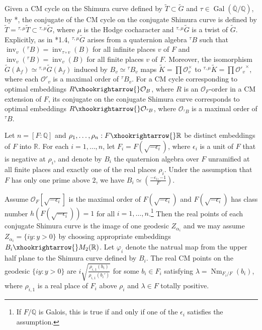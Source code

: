 \documentclass{amsart}
\numberwithin{equation}{subsection}
\numberwithin{theorem}{section}
\theoremstyle{definition}
\theoremstyle{remark}
\newcommand{\bA}{\mathbb{A}}
\newcommand{\bQ}{\mathbb{Q}}
\newcommand{\bR}{\mathbb{R}}
\newcommand{\cO}{\mathcal{O}}
\newcommand{\fp}{\mathfrak{p}}
\DeclareMathOperator{\Nm}{Nm}
\DeclareMathOperator{\Gal}{Gal}
\DeclareMathOperator{\inv}{inv}
\begin{document}
Given a CM cycle on the Shimura curve defined by $\widetilde{T}\subset \widetilde{G}$ and $\tau \in \Gal(\overline{\bQ}/\bQ)$, by \cite{MR654325}*{\MakeUppercase{}}, the conjugate of the CM cycle on the conjugate Shimura curve is defined by $\widetilde{T} = {}^{\tau,\mu}\widetilde{T}\subset{}^{\tau,\mu}\widetilde{G}$, where $\mu$ is the Hodge cocharacter and ${}^{\tau,\mu}\widetilde{G}$ is a twist of $\widetilde{G}$. Explicitly, as in \cite{MR2666906}*{1.4}, $^{\tau,\mu}\widetilde{G}$ arises from a quaternion algebra ${}^{\tau\!}B$ such that $\inv_{v}({}^{\tau\!}B) = \inv_{\tau\circ v}(B)$ for all infinite places $v$ of $F$ and $\inv_v({}^{\tau\!}B) = \inv_{v}(B)$ for all finite places $v$ of $F$. 
Moreover, the isomorphism $\widetilde{G}(\bA_f)\simeq {}^{\tau,\mu}\widetilde{G}(\bA_f)$ induced by $B_v\simeq {}^{\tau\!}B_v$ 
maps $\widetilde{K} = \prod\cO_v^\times$  
to ${}^{\tau,\mu}\widetilde{K} = \prod{\cO'_v}^\times$, 
where each $\cO'_v$ is a maximal order of ${}^{\tau\!}B_v$.
For a CM cycle corresponding to optimal embeddings $R\xhookrightarrow{}\cO_B$, where $R$ is an $\cO_F$-order in a CM extension of $F$, its conjugate on the conjugate Shimura curve corresponds to optimal embeddings $R\xhookrightarrow{}\cO_{{}^{\tau\!}B}$, where $\cO_{{}^{\tau\!}B}$ is a maximal order of ${}^{\tau\!}B$. %

Let $n = [F:\bQ]$ and $\rho_1, \dotsc, \rho_n:F\xhookrightarrow{}\bR$ be distinct embeddings of $F$ into $\bR$. 
For each $i=1, \dotsc, n$, let $F_i = F(\sqrt{-\epsilon_i})$, where $\epsilon_i$ is a unit of $F$ that is negative at $\rho_i$, and denote by $B_i$ the quaternion algebra over $F$ unramified at all finite places and exactly one of the real places $\rho_i$. Under the assumption that $F$ has only one prime above $2$, we have $B_i\simeq \left(\frac{-\epsilon_i, -1}{F}\right)$.

Assume $\mathcal{O}_F[\sqrt{-\epsilon_i}]$ is the maximal order of $F(\sqrt{-\epsilon_i})$ and $F(\sqrt{-\epsilon_i})$ has class number $h(F(\sqrt{-\epsilon_i})) = 1$ for all $i=1, \dots,n$.\footnote{If $F/\bQ$ is Galois, this is true if and only if one of the $\epsilon_i$ satisfies the assumption.} Then the real points of each conjugate Shimura curve is the image of one geodesic $Z_{\alpha_i}$ and we may assume $Z_{\alpha_i} = \{iy:y>0\}$ by choosing appropriate embeddings $B_i\xhookrightarrow{}M_{2}(\bR)$. Let $\varphi_i$ denote the natrual map from the upper half plane to the Shimura curve defined by $B_i$. 
The real CM points on the geodesic $\{iy:y>0\}$ are $i \sqrt{\frac{\rho_{i,1}(b_i)}{\rho_{i,1}(b_i')}}$ for some $b_i \in F_i$ satisfying $\lambda = \Nm_{F_i/F}(b_i)$, where $\rho_{i,1}$ is a real place of $F_i$ above $\rho_i$ and $\lambda\in F$ totally positive. 
\end{document}
